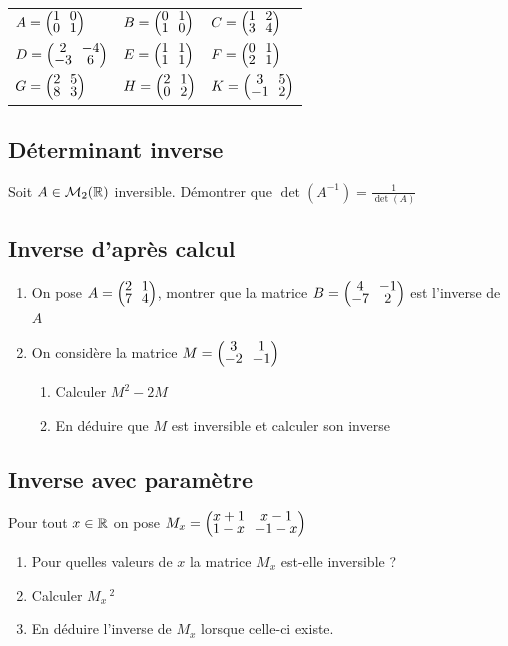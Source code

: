 \documentclass[oneside,12pt]{book}          %
\begin{document}
\renewcommand{\arraystretch}{1.6}
    \begin{tabular}{p{} p{} p{}}
        $A=\matrice{1&0\\0&1}$ & $B=\matrice{0&1\\1&0}$ & $C=\matrice{1&2\\3&4} $  \\
        $D=\matrice{2&-4\\-3&6}$ & $E=\matrice{1&1\\1&1}$ & $F=\matrice{0&1\\2&1}$ \\
        $G=\matrice{2&5\\8&3} $ & $H=\matrice{2&1\\0&2} $ & $K=\matrice{3&5\\-1&2} $ \\
    \end{tabular}



\subsection{Déterminant inverse}
Soit $A\in\mathcal{M}_2({\mathbb R})$ inversible. Démontrer que $\det(A^{-1})=\frac{1}{\det(A)}$



\subsection{Inverse d'après calcul}
\begin{enumerate}
    \item On pose $A=\matrice{2&1\\7&4}$, montrer que la matrice $B=\matrice{4&-1\\-7&2}$ est l'inverse de $A$

    \item On considère la matrice $M=\matrice{3&1\\-2&-1}$
        \begin{enumerate}
            \item Calculer $M^2-2M$
            \item En déduire que $M$ est inversible et calculer son inverse
        \end{enumerate}
\end{enumerate}



\subsection{Inverse avec paramètre}
Pour tout ${x\in\mathbb R}$ on pose $M_x=\matrice{x+1&x-1\\1-x&-1-x}$
    \begin{enumerate}
        \item Pour quelles valeurs de $x$ la matrice $M_x$ est-elle inversible ?
        \item Calculer $M_x\,^2$
        \item En déduire l'inverse de $M_x$ lorsque celle-ci existe.
    \end{enumerate}
\end{document}
